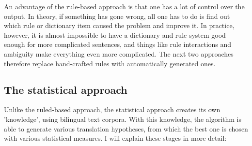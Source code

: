\documentclass[12pt]{article}
\begin{document}
An advantage of the rule-based approach is that one has a lot of control over the output. In theory, if something has gone wrong, all one has to do is find out which rule or dictionary item caused the problem and improve it. In practice, however, it is almost impossible to have a dictionary and rule system good enough for more complicated sentences, and things like rule interactions and ambiguity make everything even more complicated. The next two approaches therefore replace hand-crafted rules with automatically generated ones.


\subsection{The statistical approach}

Unlike the ruled-based approach, the statistical approach creates its own 'knowledge', using bilingual text corpora. With this knowledge, the algorithm is able to generate various translation hypotheses, from which the best one is chosen with various statistical measures. I will explain these stages in more detail:
\end{document}
